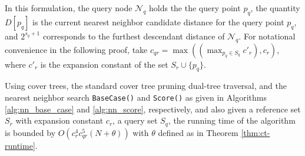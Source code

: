 In this formulation, the query node $\mathscr{N}_q$ holds the the query point
$p_q$, the quantity $D[p_q]$ is the current nearest neighbor candidate distance
for the query point $p_q$, and $2^{s_q + 1}$ corresponds to the furthest
descendant distance of $\mathscr{N}_q$.  For notational convenience in the
following proof, take $c_{qr} = \max((\max_{p_q \in S_q} c'_r), c_r)$, where
$c'_r$ is the expansion constant of the set $S_r \cup \{ p_q \}$.



\begin{thm}
Using cover trees, the standard cover tree pruning dual-tree traversal, and the
nearest neighbor search \texttt{BaseCase()} and \texttt{Score()} as given in
Algorithms \ref{alg:nn_base_case} and \ref{alg:nn_score}, respectively, and also
given a reference set $S_r$ with expansion constant $c_r$, a query set $S_q$,
the running time of the algorithm is bounded by $O(c_r^4 c_{qr}^5 (N + \theta))$
with $\theta$ defined as in Theorem \ref{thm:ct-runtime}.
\label{thm:nns}
\end{thm}

